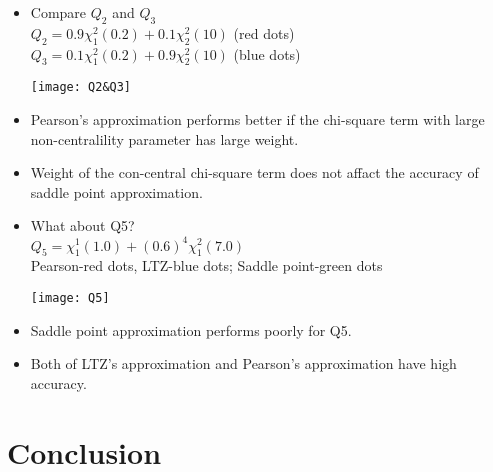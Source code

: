 \documentclass[10pt]{beamer}
\begin{document}
\begin{frame}
	\begin{itemize} 
		\item Compare $ Q_2$ and $Q_3$\\	
		\scriptsize
		$Q_2= 0.9\chi_1^2(0.2)+0.1\chi_2^2(10)	$   (red dots)\\
     	$Q_3= 0.1\chi_1^2(0.2)+0.9\chi_2^2(10)	$    (blue dots)	
		\graphicspath{{C:/Users/riyi/Desktop/yusha/fall2015-sha/STAT-5123/project}}
		\texttt{[image: Q2\&Q3]}
		\small
		\item Pearson's approximation performs better if the chi-square term with large non-centralility parameter has large weight.\\
		\item Weight of the con-central chi-square term does not affact the accuracy of saddle point approximation.
	\end{itemize}
\end{frame}

\begin{frame}
	\begin{itemize} 
		\item What about Q5?\\	
		\scriptsize
		$Q_5=\chi_1^1(1.0)+(0.6)^4\chi_1^2(7.0)$  \\
		Pearson-red dots,  LTZ-blue dots; Saddle point-green dots\\
		\graphicspath{{C:/Users/riyi/Desktop/yusha/fall2015-sha/STAT-5123/project}}
		\texttt{[image: Q5]}
		\small
		\item Saddle point approximation performs poorly for Q5.
		\\
		\item Both of LTZ's approximation and Pearson's approximation have high accuracy.
	\end{itemize}
\end{frame}

\section{Conclusion}
\end{document}
